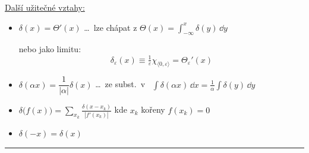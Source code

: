 \documentclass[11pt,a4paper]{article}
\begin{document}
\underline{Další užitečné vztahy:}
\begin{itemize}
  \item $\delta(x) = \Theta'(x)$ \quad \dots\ lze chápat z \quad $\Theta(x) = \displaystyle\int_{-\infty}^{x}\delta(y)\,\dd y$

  \begin{minipage}{0.45\textwidth}
  nebo jako limitu:
  \[ \delta_\varepsilon(x) \equiv \tfrac{1}{\varepsilon}\chi_{\langle 0,\varepsilon\rangle} = \Theta_\varepsilon'(x) \]
  \end{minipage}
  \begin{minipage}{0.5\textwidth}
  \end{minipage}
  \item $\delta(\alpha x) = \dfrac{1}{|\alpha|}\delta(x)$ \quad \dots\ ze subst.\ v \ $\int\delta(\alpha x)\,\dd x = \frac1\alpha\int\delta(y)\,\dd y$
  \item $\delta\big(f(x)\big) = \displaystyle\sum_{x_k}\frac{\delta(x - x_k)}{|f'(x_k)|}$ \quad kde $x_k$ kořeny $f(x_k) = 0$
  \item $\delta(-x) = \delta(x)$
\end{itemize}
\noindent\rule{\linewidth}{0.4pt}

\newpage

\newpage

\newpage

\newpage

\newpage

\newpage

\newpage

\newpage

\newpage

\end{document}
